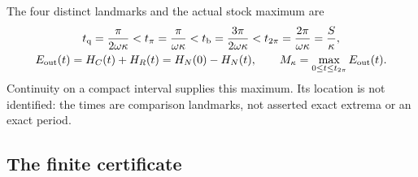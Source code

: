 The four distinct landmarks and the actual stock maximum are
\begin{equation}\label{eq:landmarks}%
\begin{gathered}
t_{\rm q}=\frac{\pi}{2\omega\kappa}<t_\pi=\frac{\pi}{\omega\kappa}
<t_{\rm b}=\frac{3\pi}{2\omega\kappa}<t_{2\pi}=\frac{2\pi}{\omega\kappa}=\frac S\kappa,\\
E_{\rm out}(t)=H_C(t)+H_R(t)=H_N(0)-H_N(t),\qquad
M_\kappa=\max_{0\le t\le t_{2\pi}}E_{\rm out}(t).
\end{gathered}
\end{equation}
Continuity on a compact interval supplies this maximum. Its location is not identified: the times are comparison landmarks, not asserted exact extrema or an exact period.

\subsection{The finite certificate}
